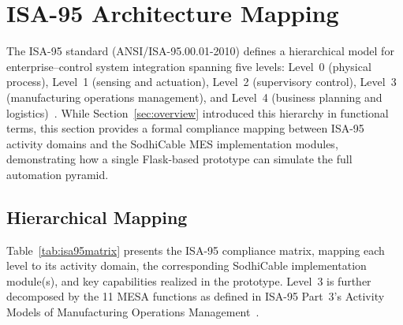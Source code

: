 %
%


\section{ISA-95 Architecture Mapping}\label{sec:isa95mapping}

The ISA-95 standard (ANSI/ISA-95.00.01-2010) defines a hierarchical model for
enterprise--control system integration spanning five levels: Level~0 (physical
process), Level~1 (sensing and actuation), Level~2 (supervisory control),
Level~3 (manufacturing operations management), and Level~4 (business planning
and logistics)~\cite{isa95}.  While Section~\ref{sec:overview} introduced this
hierarchy in functional terms, this section provides a formal compliance mapping
between ISA-95 activity domains and the SodhiCable MES implementation modules,
demonstrating how a single Flask-based prototype can simulate the full
automation pyramid.

\subsection{Hierarchical Mapping}

Table~\ref{tab:isa95matrix} presents the ISA-95 compliance matrix, mapping each
level to its activity domain, the corresponding SodhiCable implementation
module(s), and key capabilities realized in the prototype.  Level~3 is further
decomposed by the 11 MESA functions as defined in ISA-95 Part~3's Activity
Models of Manufacturing Operations Management~\cite{isa95part3}.

